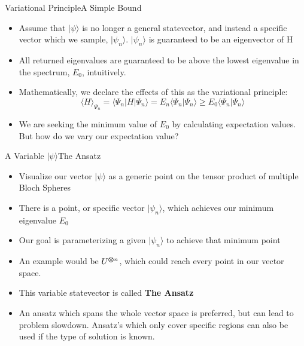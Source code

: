 \begin{frame}{Variational Principle}{A Simple Bound}

\begin{itemize}
    \item Assume that $| \psi \rangle$ is no longer a general statevector, and instead a specific vector which we sample, $| \psi_n \rangle$. $| \psi_n \rangle$ is guaranteed to be an eigenvector of H
    \item All returned eigenvalues are guaranteed to be above the lowest eigenvalue in the spectrum, $E_0$, intuitively.
    \item Mathematically, we declare the effects of this as the variational principle:
    \begin{equation*}
        \langle H \rangle_{\Psi_n} = \langle \Psi_n | H | \Psi_n \rangle = E_n \langle \Psi_n | \Psi_n \rangle \geq E_0 \langle \Psi_n | \Psi_n \rangle 
    \end{equation*}
    \item We are seeking the minimum value of $E_0$ by calculating expectation values. But how do we vary our expectation value?
\end{itemize}

\end{frame}




\begin{frame}{A Variable $ |\psi \rangle$}{The Ansatz}
\begin{itemize}
    \item Visualize our vector $| \psi \rangle$ as a generic point on the tensor product of multiple Bloch Spheres
    \item There is a point, or specific vector $| \psi_n \rangle$, which achieves our minimum eigenvalue $E_0$
    \item Our goal is parameterizing a given  $| \psi_n \rangle$ to achieve that minimum point
    \item An example would be $U^{\bm{\otimes} n}$, which could reach every point in our vector space.
    \item This variable statevector is called \textbf{The Ansatz}
    \item An ansatz which spans the whole vector space is preferred, but can lead to problem slowdown. Ansatz's which only cover specific regions can also be used if the type of solution is known.
\end{itemize}

\end{frame}


